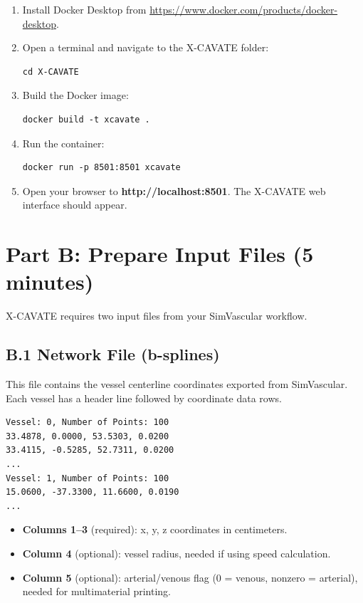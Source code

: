 \documentclass[11pt,letterpaper]{article}
\begin{document}
\begin{enumerate}
    \item Install Docker Desktop from \url{https://www.docker.com/products/docker-desktop}.

    \item Open a terminal and navigate to the X-CAVATE folder:
    \begin{lstlisting}
cd X-CAVATE
    \end{lstlisting}

    \item Build the Docker image:
    \begin{lstlisting}
docker build -t xcavate .
    \end{lstlisting}

    \item Run the container:
    \begin{lstlisting}
docker run -p 8501:8501 xcavate
    \end{lstlisting}

    \item Open your browser to \textbf{http://localhost:8501}. The X-CAVATE web interface should appear.
\end{enumerate}


\section{Part B: Prepare Input Files (5 minutes)}

X-CAVATE requires two input files from your SimVascular workflow.

\subsection{B.1 Network File (b-splines)}

This file contains the vessel centerline coordinates exported from SimVascular. Each vessel has a header line followed by coordinate data rows.

\begin{lstlisting}
Vessel: 0, Number of Points: 100
33.4878, 0.0000, 53.5303, 0.0200
33.4115, -0.5285, 52.7311, 0.0200
...
Vessel: 1, Number of Points: 100
15.0600, -37.3300, 11.6600, 0.0190
...
\end{lstlisting}

\begin{itemize}
    \item \textbf{Columns 1--3} (required): x, y, z coordinates in centimeters.
    \item \textbf{Column 4} (optional): vessel radius, needed if using speed calculation.
    \item \textbf{Column 5} (optional): arterial/venous flag (0 = venous, nonzero = arterial), needed for multimaterial printing.
\end{itemize}
\end{document}
